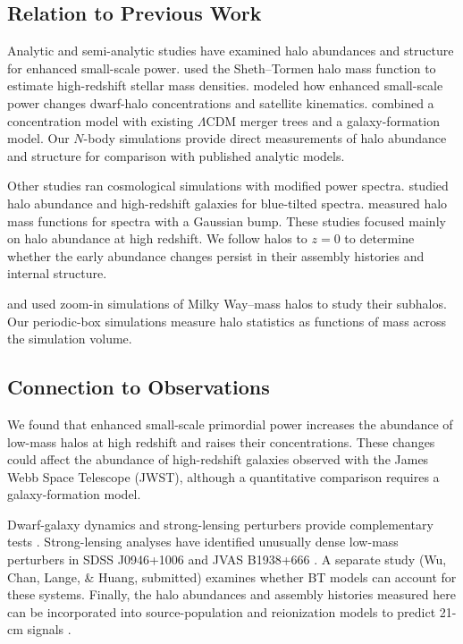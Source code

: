 \documentclass[
 reprint,
 superscriptaddress,
 nofootinbib,
 nobibnotes,
 amsmath,
 amssymb,
 aps,
 prd,
 floatfix,
 longbibliography
]{revtex4-2}
\begin{document}
\subsection{Relation to Previous Work}

Analytic and semi-analytic studies have examined halo abundances and structure for enhanced small-scale power. \citet{Parashari23JWSTPPS} used the Sheth--Tormen halo mass function to estimate high-redshift stellar mass densities. \citet{Esteban2024lumpyDM} modeled how enhanced small-scale power changes dwarf-halo concentrations and satellite kinematics. \citet{Dekker25DwarfPPS} combined a concentration model with existing \(\Lambda\)CDM merger trees and a galaxy-formation model. Our \(N\)-body simulations provide direct measurements of halo abundance and structure for comparison with published analytic models.

Other studies ran cosmological simulations with modified power spectra. \citet{Hira24bluetilt} studied halo abundance and high-redshift galaxies for blue-tilted spectra. \citet{Tkac24BumpyPPS} measured halo mass functions for spectra with a Gaussian bump. These studies focused mainly on halo abundance at high redshift. We follow halos to \(z=0\) to determine whether the early abundance changes persist in their assembly histories and internal structure.

\citet{Wu25BT} and \citet{Nadler2025enhanced} used zoom-in simulations of Milky Way--mass halos to study their subhalos. Our periodic-box simulations measure halo statistics as functions of mass across the simulation volume.


\subsection{Connection to Observations}

We found that enhanced small-scale primordial power increases the abundance of low-mass halos at high redshift and raises their concentrations. These changes could affect the abundance of high-redshift galaxies observed with the James Webb Space Telescope (JWST), although a quantitative comparison requires a galaxy-formation model.

Dwarf-galaxy dynamics and strong-lensing perturbers provide complementary tests \citep{Dekker25DwarfPPS,Gilman22SubgalacticPPS}. Strong-lensing analyses have identified unusually dense low-mass perturbers in SDSS J0946+1006 and JVAS B1938+666 \citep{Minor2021HighConcentration,Tajalli2025DensePerturbers}. A separate study (Wu, Chan, Lange, \& Huang, submitted) examines whether BT models can account for these systems. Finally, the halo abundances and assembly histories measured here can be incorporated into source-population and reionization models to predict 21-cm signals \citep{Munoz20SmallScale21cm,deKruijf25DarkAges,Zhu26SKAPPS}.
\end{document}
